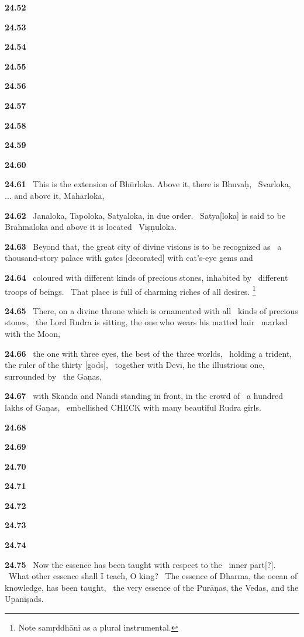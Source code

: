 \documentclass{article}
\begin{document}
\textbf{24.52}%


\textbf{24.53}%


\textbf{24.54}%


\textbf{24.55}%


\textbf{24.56}%


\textbf{24.57}%


\textbf{24.58}%


\textbf{24.59}%


\textbf{24.60}%


\textbf{24.61}%
\ This is the extension of Bhūrloka. Above it, there is Bhuvaḥ,%
\ Svarloka, ... and above it, Maharloka,%


\textbf{24.62}%
\ Janaloka, Tapoloka, Satyaloka, in due order.%
\ Satya[loka] is said to be Brahmaloka and above it is located%
\                         Viṣṇuloka.%


\textbf{24.63}%
\ Beyond that, the great city of divine visions is to be recognized as%
\ a thousand-story palace with gates [decorated] with cat's-eye gems and%


\textbf{24.64}%
\ coloured with different kinds of precious stones, inhabited by%
\                         different troops of beings.%
\ That place is full of charming riches of all desires.%
\footnote{Note samṛddhāni as a plural instrumental. }%


\textbf{24.65}%
\ There, on a divine throne which is ornamented with all%
\                 kinds of precious stones,%
\ the Lord Rudra is sitting, the one who wears his matted hair%
\              marked with the Moon,%


\textbf{24.66}%
\ the one with three eyes, the best of the three worlds,%
\                 holding a trident, the ruler of the thirty [gods],%
\ together with Devī, he the illustrious one, surrounded by%
\                                 the Gaṇas,%


\textbf{24.67}%
\ with Skanda and Nandi standing in front, in the crowd of%
\                       a hundred lakhs of Gaṇas,%
\ embellished CHECK with many beautiful Rudra girls.%


\textbf{24.68}%


\textbf{24.69}%


\textbf{24.70}%


\textbf{24.71}%


\textbf{24.72}%


\textbf{24.73}%


\textbf{24.74}%


\textbf{24.75}%
\ Now the essence has been taught with respect to the%
\              inner part[?].%
\ What other essence shall I teach, O king?%
\ The essence of Dharma, the ocean of knowledge, has been taught,%
\ the very essence of the Purāṇas, the Vedas, and the Upaniṣads.%
\end{document}
